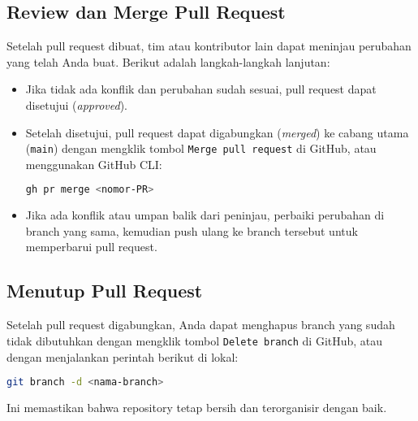\subsection{Review dan Merge Pull Request}

Setelah pull request dibuat, tim atau kontributor lain dapat meninjau perubahan yang telah Anda buat. Berikut adalah langkah-langkah lanjutan:
\begin{itemize}
	\item Jika tidak ada konflik dan perubahan sudah sesuai, pull request dapat disetujui (\textit{approved}).
	\item Setelah disetujui, pull request dapat digabungkan (\textit{merged}) ke cabang utama (\texttt{main}) dengan mengklik tombol \texttt{Merge pull request} di GitHub, atau menggunakan GitHub CLI:
	\begin{lstlisting}[language=bash]
		gh pr merge <nomor-PR>
	\end{lstlisting}
	\item Jika ada konflik atau umpan balik dari peninjau, perbaiki perubahan di branch yang sama, kemudian push ulang ke branch tersebut untuk memperbarui pull request.
\end{itemize}

\subsection{Menutup Pull Request}

Setelah pull request digabungkan, Anda dapat menghapus branch yang sudah tidak dibutuhkan dengan mengklik tombol \texttt{Delete branch} di GitHub, atau dengan menjalankan perintah berikut di lokal:
\begin{lstlisting}[language=bash]
	git branch -d <nama-branch>
\end{lstlisting}

Ini memastikan bahwa repository tetap bersih dan terorganisir dengan baik.
